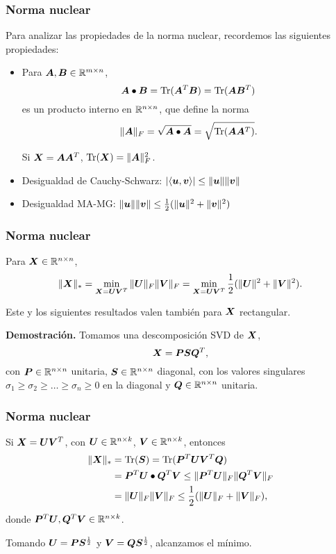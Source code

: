 \documentclass[aspectratio=169,12pt,spanish]{beamer}
\begin{document}

\begin{frame}
\frametitle{Norma nuclear}


Para analizar las propiedades de la norma nuclear, recordemos las siguientes propiedades:
\begin{itemize}
\item Para $\bm{A}, \bm{B} \in \mathbb{R}^{m \times n}$, 
$$\bm{A} \bullet \bm{B} = \operatorname{Tr}(\bm{A}^T \bm{B})= \operatorname{Tr}(\bm{A} \bm{B}^T)$$ 
es un producto interno en $\mathbb{R}^{n \times n}$, que define la norma 
$$\|\bm{A}\|_F = \sqrt{\bm{A} \bullet \bm{A}} = \sqrt{\operatorname{Tr}(\bm{A} \bm{A}^T)}.$$

Si $\bm{X} = \bm{A} \bm{A}^T$, $\operatorname{Tr}(\bm{X}) = \|\bm{A}\|_F^2$.
\item Desigualdad de Cauchy-Schwarz: $|\langle \bm{u}, \bm{v} \rangle| \le \|\bm{u}\| \|\bm{v}\|$
\item Desigualdad MA-MG: $\|\bm{u}\| \|\bm{v}\| \le \frac{1}{2}(\|\bm{u}\|^2 + \|\bm{v}\|^2)$
\end{itemize}

\end{frame}


\begin{frame}
\frametitle{Norma nuclear}

\begin{lemma}
Para $\bm{X} \in \mathbb{R}^{n \times n}$, 
$$
\|\bm{X}\|_* = \min_{\bm{X} = \bm{U} \bm{V}^T} \|\bm{U}\|_{F} \|\bm{V}\|_{F} = \min_{\bm{X} = \bm{U} \bm{V}^T} \frac{1}{2}(\|\bm{U}\|^2 + \|\bm{V}\|^2).
 $$
\end{lemma}

{\small Este y los siguientes resultados valen también para $\bm{X}$ rectangular.}

\textbf{Demostración.} Tomamos una descomposición SVD de $\bm{X}$, 
$$\bm{X} = \bm{P} \bm{S} \bm{Q}^T,$$ 
con $\bm{P} \in \mathbb{R}^{n \times n}$ unitaria, $\bm{S} \in \mathbb{R}^{n \times n}$ diagonal, con los valores singulares $\sigma_1 \ge \sigma_2 \ge \dots \ge \sigma_n \ge 0$ en la diagonal y $\bm{Q} \in \mathbb{R}^{n \times n}$ unitaria.

\end{frame}


\begin{frame}
\frametitle{Norma nuclear}

Si $\bm{X} = \bm{U} \bm{V}^T$, con $\bm{U} \in \mathbb{R}^{n \times k}$, $\bm{V} \in \mathbb{R}^{n \times k}$, entonces
\begin{align*}
\|\bm{X}\|_* &= \operatorname{Tr}(\bm{S}) = \operatorname{Tr}(\bm{P}^T \bm{U} \bm{V}^T \bm{Q}) \\
&= \bm{P}^T \bm{U} \bullet \bm{Q}^T \bm{V} \le \|\bm{P}^T \bm{U}\|_F\|\bm{Q}^T \bm{V}\|_F \\
&=  \|\bm{U}\|_F\|\bm{V}\|_F \le \frac{1}{2}(\|\bm{U}\|_F + \|\bm{V}\|_F),
\end{align*}
donde $\bm{P}^T\bm{U}, \bm{Q}^T\bm{V} \in \mathbb{R}^{n \times k}$.

Tomando $\bm{U} = \bm{P} \bm{S}^{\frac12}$ y $\bm{V} = \bm{Q} \bm{S}^{\frac12}$, alcanzamos el mínimo.
\end{frame}
\end{document}
